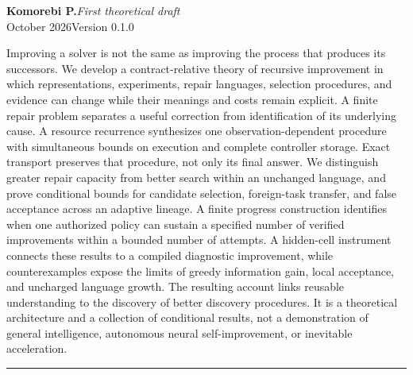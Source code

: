 \documentclass[11pt,letterpaper]{article}
\theoremstyle{plain}
\theoremstyle{definition}
\begin{document}
\hypersetup{pageanchor=false}
\begin{titlepage}\thispagestyle{empty}
\vspace*{.25in}
\par
\vspace{.65in}
\vspace{.19in}
\vspace{.27in}\noindent{\color{ink}\rule{\textwidth}{.85pt}}\par
\vspace{.16in}
\noindent\textbf{Komorebi P.}\hfill\textit{First theoretical draft}\\
 October 2026\hfill Version 0.1.0\par
\vspace{.38in}
\par\smallskip
\noindent Improving a solver is not the same as improving the process that produces its successors. We develop a contract-relative theory of recursive improvement in which representations, experiments, repair languages, selection procedures, and evidence can change while their meanings and costs remain explicit. A finite repair problem separates a useful correction from identification of its underlying cause. A resource recurrence synthesizes one observation-dependent procedure with simultaneous bounds on execution and complete controller storage. Exact transport preserves that procedure, not only its final answer. We distinguish greater repair capacity from better search within an unchanged language, and prove conditional bounds for candidate selection, foreign-task transfer, and false acceptance across an adaptive lineage. A finite progress construction identifies when one authorized policy can sustain a specified number of verified improvements within a bounded number of attempts. A hidden-cell instrument connects these results to a compiled diagnostic improvement, while counterexamples expose the limits of greedy information gain, local acceptance, and uncharged language growth. The resulting account links reusable understanding to the discovery of better discovery procedures. It is a theoretical architecture and a collection of conditional results, not a demonstration of general intelligence, autonomous neural self-improvement, or inevitable acceleration.
\vfill\noindent\rule{\textwidth}{.4pt}\par\smallskip
{}
\end{titlepage}
\hypersetup{pageanchor=true}
\begingroup\small\setlength{\parskip}{0pt}\tableofcontents\endgroup\clearpage
\end{document}

